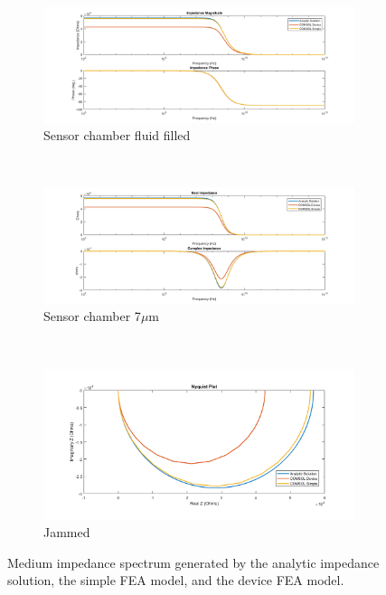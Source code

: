 \begin{figure}[h]
    \centering
    \begin{subfigure}[b]{\textwidth}
        \centering
        \includegraphics[width=\textwidth]{images/IS_model_medium_mag_phase.png}
        \caption{Sensor chamber fluid filled}
    \end{subfigure}
    \\
    \vspace{0.1 in}
    \begin{subfigure}[b]{\textwidth}
        \centering
        \includegraphics[width=\textwidth]{images/IS_model_medium_real_imag.png}
        \caption{Sensor chamber 7$\mu$m }
    \end{subfigure}
    \\
    \vspace{0.1 in}
    \begin{subfigure}[b]{\textwidth}
        \centering
        \includegraphics[width=\textwidth]{images/IS_model_medium_nyquist.png}
        \caption{Jammed}
    \end{subfigure}
    \caption[Analyitic and FEA generated medium impedance spectrum]{Medium impedance spectrum generated by the analytic impedance solution, the simple FEA model, and the device FEA model.}
    \label{fig:medium_model_IS_data}
\end{figure}

